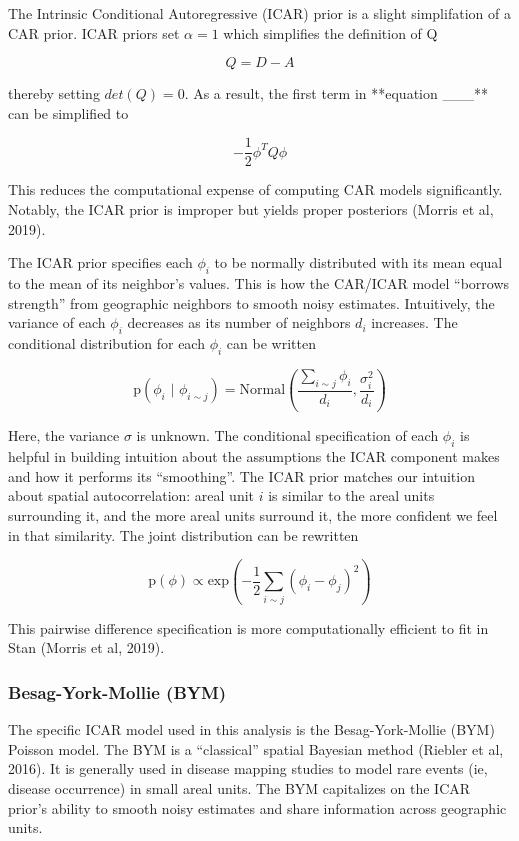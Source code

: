 \documentclass[
]{article}
\begin{document}
The Intrinsic Conditional Autoregressive (ICAR) prior is a slight
simplifation of a CAR prior. ICAR priors set \(\alpha = 1\) which
simplifies the definition of Q

\[
Q = D-A
\]

thereby setting \(det(Q) = 0\). As a result, the first term in
**equation \_\_\_** can be simplified to

\[
-\frac{1}{2}\phi^TQ\phi
\]

This reduces the computational expense of computing CAR models
significantly. Notably, the ICAR prior is improper but yields proper
posteriors (Morris et al, 2019).

The ICAR prior specifies each \(\phi_i\) to be normally distributed with
its mean equal to the mean of its neighbor's values. This is how the
CAR/ICAR model ``borrows strength'' from geographic neighbors to smooth
noisy estimates. Intuitively, the variance of each \(\phi_i\) decreases
as its number of neighbors \(d_i\) increases. The conditional
distribution for each \(\phi_i\) can be written

\[
\text{p}(\phi_i \text{ | } \phi_{i \sim j}) = \text{Normal}(\frac{\sum_{i \sim j}\phi_i}{d_i}, \frac{\sigma_i^2}{d_i})
\]

Here, the variance \(\sigma\) is unknown. The conditional specification
of each \(\phi_i\) is helpful in building intuition about the
assumptions the ICAR component makes and how it performs its
``smoothing''. The ICAR prior matches our intuition about spatial
autocorrelation: areal unit \(i\) is similar to the areal units
surrounding it, and the more areal units surround it, the more confident
we feel in that similarity. The joint distribution can be rewritten

\[
\text{p}(\phi) \propto \text{exp}(-\frac{1}{2}\sum_{i \sim j}(\phi_i - \phi_j)^2)
\]

This pairwise difference specification is more computationally efficient
to fit in Stan (Morris et al, 2019).

\hypertarget{besag-york-mollie-bym}{%
\subsubsection{Besag-York-Mollie (BYM)}\label{besag-york-mollie-bym}}

The specific ICAR model used in this analysis is the Besag-York-Mollie
(BYM) Poisson model. The BYM is a ``classical'' spatial Bayesian method
(Riebler et al, 2016). It is generally used in disease mapping studies
to model rare events (ie, disease occurrence) in small areal units. The
BYM capitalizes on the ICAR prior's ability to smooth noisy estimates
and share information across geographic units.
\end{document}
